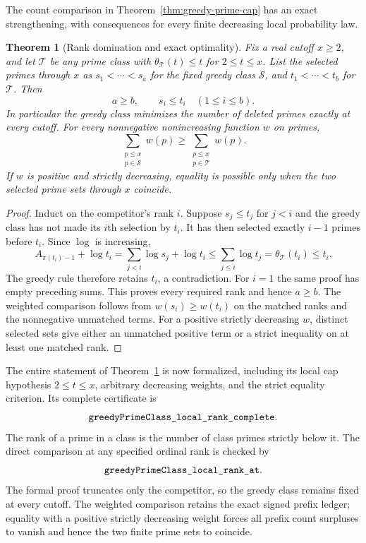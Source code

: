 \documentclass[11pt]{article}
\newtheorem{theorem}{Theorem}[section]
\theoremstyle{definition}
\begin{document}
The count comparison in Theorem~\ref{thm:greedy-prime-cap}
has an exact strengthening, with consequences for every finite
decreasing local probability law.

\begin{theorem}[Rank domination and exact optimality]
\label{thm:capped-prime-rank-extremum}
Fix a real cutoff $x\ge2$, and let $\mathcal T$ be any prime
class with $\theta_{\mathcal T}(t)\le t$ for $2\le t\le x$.
List the selected primes through $x$ as
$s_1<\cdots<s_a$ for the fixed greedy class $\mathcal S$,
and $t_1<\cdots<t_b$ for $\mathcal T$.
Then
\begin{equation}
                  a\ge b,\qquad s_i\le t_i\quad(1\le i\le b).
 \label{eq:capped-prime-rank-extremum}
\end{equation}
In particular the greedy class minimizes the number of deleted
primes exactly at every cutoff.
For every nonnegative nonincreasing function $w$ on primes,
\[
 \sum_{\substack{p\le x\\p\in\mathcal S}}w(p)
       \ge\sum_{\substack{p\le x\\p\in\mathcal T}}w(p).
\]
If $w$ is positive and strictly decreasing, equality is possible
only when the two selected prime sets through $x$ coincide.
\end{theorem}

\begin{proof}
Induct on the competitor's rank $i$.
Suppose $s_j\le t_j$ for $j<i$ and the greedy class has not
made its $i$th selection by $t_i$.
It has then selected exactly $i-1$ primes before $t_i$.
Since $\log$ is increasing,
\[
 A_{\pi(t_i)-1}+\log t_i
   =\sum_{j<i}\log s_j+\log t_i
   \le\sum_{j\le i}\log t_j
   =\theta_{\mathcal T}(t_i)\le t_i .
\]
The greedy rule therefore retains $t_i$, a contradiction.
For $i=1$ the same proof has empty preceding sums.
This proves every required rank and hence $a\ge b$.
The weighted comparison follows from $w(s_i)\ge w(t_i)$
on the matched ranks and the nonnegative unmatched terms.
For a positive strictly decreasing $w$, distinct selected
sets give either an unmatched positive term or a strict
inequality on at least one matched rank.
\end{proof}

The entire statement of Theorem~\ref{thm:capped-prime-rank-extremum}
is now formalized, including its local cap hypothesis
$2\le t\le x$, arbitrary decreasing weights, and the strict
equality criterion. Its complete certificate is
\[
 \texttt{greedyPrimeClass\_\allowbreak local\_\allowbreak rank\_\allowbreak complete}.
\]
The rank of a prime in a class is the number of class primes
strictly below it. The direct comparison at any specified
ordinal rank is checked by
\[
 \texttt{greedyPrimeClass\_\allowbreak local\_\allowbreak rank\_\allowbreak at}.
\]
The formal proof truncates only the competitor, so the
greedy class remains fixed at every cutoff.
The weighted comparison retains the exact signed prefix
ledger; equality with a positive strictly decreasing weight
forces all prefix count surpluses to vanish and hence the
two finite prime sets to coincide.
\end{document}
